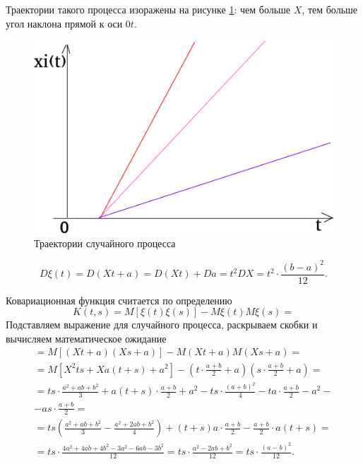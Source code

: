 Траектории такого процесса изоражены на рисунке \ref{fig:212}: чем больше $X$,
тем больше угол наклона прямой к оси $0t$.

\begin{figure}[h!]
 \centering
 \includegraphics[width=.5\textwidth]{./pictures/2_12.png}
 \caption{Траектории случайного процесса}
 \label{fig:212}
\end{figure}

$$D \xi \left( t \right) =
  D \left( Xt + a \right) =
  D \left( Xt \right) + Da =
  t^2 DX =
  t^2 \cdot \frac{ \left( b - a \right)^2}{12}.$$

Ковариационная функция считается по определению
$$K \left( t, s \right) =
  M \left[ \xi \left( t \right) \xi \left( s \right) \right] -
  M \xi \left( t \right) M \xi \left( s \right) =$$
Подставляем выражение для случайного процесса, раскрываем скобки и вычисляем математическое ожидание
\begin{equation*}
  \begin{split}
    = M \left[ \left( Xt + a \right) \left( Xs + a \right) \right] -
    M \left( Xt + a \right) M \left( Xs + a \right) = \\
    = M \left[ X^2 ts + Xa \left(t + s \right) + a^2 \right] -
    \left( t \cdot \frac{a + b}{2} + a \right) \left( s \cdot \frac{a + b}{2} + a \right) = \\
    = ts \cdot \frac{a^2 + ab + b^2}{3} + a \left( t + s \right) \cdot \frac{a + b}{2} + a^2 -
    ts \cdot \frac{ \left( a + b \right)^2}{4} - ta \cdot \frac{a + b}{2} - a^2 - \\
    - as \cdot \frac{a + b}{2} = \\
    = ts \left( \frac{a^2 + ab + b^2}{3} - \frac{a^2 + 2ab + b^2}{4} \right) +
    \left(t + s \right) a \cdot \frac{a + b}{2} - \frac{a + b}{2} \cdot a \left( t + s \right) = \\
    = ts \cdot \frac{4a^2 + 4ab + 4b^2 - 3a^2 - 6ab - 3b^2}{12} =
    ts \cdot \frac{a^2 - 2ab + b^2}{12} =
    ts \cdot \frac{ \left( a - b \right)^2}{12}.
  \end{split}
\end{equation*}

